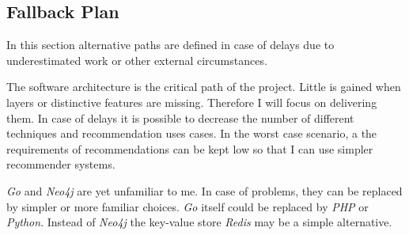 \subsection{Fallback Plan}

In this section alternative paths are defined in case of delays due to underestimated work or other external circumstances.

The software architecture is the critical path of the project. Little is gained when layers or distinctive features are missing. Therefore I will focus on delivering them. In case of delays it is possible to decrease the number of different techniques and recommendation uses cases. In the worst case scenario, a the requirements of recommendations can be kept low so that I can use simpler recommender systems.

\emph{Go} and \emph{Neo4j} are yet unfamiliar to me. In case of problems, they can be replaced by simpler or more familiar choices. \emph{Go} itself could be replaced by \emph{PHP} or \emph{Python}. Instead of \emph{Neo4j} the key-value store \emph{Redis} may be a simple alternative.